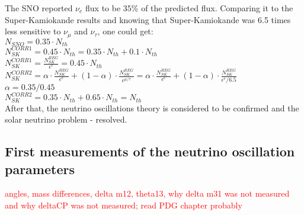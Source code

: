 The SNO reported $\nu_e$ flux to be $35\%$ of the predicted flux. Comparing it to the Super-Kamiokande results and knowing that Super-Kamiokande was 6.5 times less sensitive to $\nu_\mu$ and $\nu_\tau$, one could get:\\
$N_{SNO}=0.35 \cdot N_{th}$\\
$N_{SK}^{CORR1}=0.45 \cdot N_{th}=0.35 \cdot N_{th}+0.1 \cdot N_{th}$\\
$N_{SK}^{CORR1}=\frac{N_{SK}^{REG}}{\epsilon^{e}}=0.45 \cdot N_{th} $\\
$N_{SK}^{CORR2}=\alpha \cdot \frac{N_{SK}^{REG}}{\epsilon^{e}}+(1-\alpha) \cdot \frac{N_{SK}^{REG}}{\epsilon^{\mu/\tau}}=\alpha \cdot \frac{N_{SK}^{REG}}{\epsilon^{e}}+(1-\alpha) \cdot \frac{N_{SK}^{REG}}{\epsilon^{e}/6.5}$\\
$\alpha=0.35/0.45$\\
$N_{SK}^{CORR2}=0.35 \cdot N_{th}+0.65 \cdot N_{th}=N_{th}$\\

After that, the neutrino oscillations theory is considered to be confirmed and the solar neutrino problem - resolved. 


\subsection{First measurements of the neutrino oscillation parameters}

{\textcolor{red}{angles, mass differences, delta m12, theta13, why delta m31 was not measured and why deltaCP was not measured; read PDG chapter probably }} 

